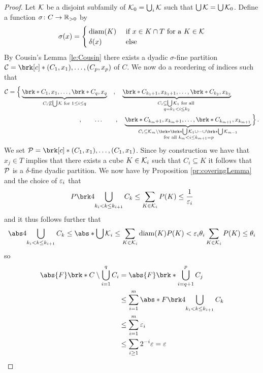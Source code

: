 \begin{proof}
Let $\mathcal{K}$ be a disjoint subfamily of $\mathcal{K}_0=\bigcup_i\mathcal{K}$ such that $\bigcup\mathcal{K}=\bigcup\mathcal{K}_0$. Define a function $\sigma\colon C\to \mathbb{R}_{>0}$ by
\begin{align*}
	\sigma(x)=\begin{cases}
		\operatorname{diam}(K)&\text{ if }x\in K\cap T\text{ for a }K\in\mathcal{K}\\
		\delta(x) &\text{ else}
	\end{cases}
\end{align*}
By Cousin's Lemma \ref{le:Cousin} there exists a dyadic $\sigma$-fine partition $\cC=\brk[c]*{(C_1,x_1),\dots,(C_p,x_p)}$ of $C$.
 We now do a reordering of indices such that
\begin{align*}
	\cC=\Big\{\underbrace{\brk*{C_1,x_1},\dots,\brk*{C_q,x_q}}_{C_i\not\subseteq\bigcup\cK\text{ for }1\leq i\leq q}\quad,\quad \underbrace{\brk*{C_{k_1+1},x_{k_1+1}},\dots,\brk*{C_{k_2},x_{k_2}}}_{\substack{C_i\subseteq \bigcup\cK_1 \text{ for all } \\ q=k_1< i\leq k_2}}\qquad\qquad&\\
	\qquad\qquad,\qquad\dots\qquad,\quad \underbrace{\brk*{C_{k_m+1},x_{k_m+1}},\dots,\brk*{C_{k_{m+1}},x_{k_{m+1}}}}_{\substack{C_i\subseteq \cK_m\setminus \brk*{\brk*{\bigcup\cK_1}\cup\dots\cup\brk*{\bigcup\cK_{m-1}}}\\ \text{ for all }  k_m< i\leq k_{m+1}=p}}\Big\}&\,.
\end{align*}
We set $\cP=\brk[c]*{(C_1,x_1),\dots,(C_1,x_1)}$. Since by construction we have that $x_j\in T$ implies that there exists a cube $K\in\mathcal{K}_i$ such that $C_i\subseteq K$ it follows that $\mathcal{P}$ is a $\delta$-fine dyadic partition.
We now have by Proposition \ref{pr:coveringLemma} and the choice of $\varepsilon_i$ that
\begin{align*}
	P\brk4{\bigcup_{k_i<k\leq k_{i+1}}C_k}
	\leq \sum_{K\in\cK_i}P(K)
	\leq \frac{1}{\e_i}
\end{align*}
and it thus follows further that
\begin{align*}
	\abs4{\bigcup_{k_i<k\leq k_{i+1}}C_k}
	\leq \abs*{\bigcup\cK_i}
	\leq \sum_{K\in\cK_i}\diam(K)P(K)
	<\e_i\theta_i\sum_{K\in\cK_i}P(K)\leq \theta_i
\end{align*}
so
\begin{align*}
	\abs{F}\brk*{C\setminus\bigcup_{i=1}^q C_i}
	&=\abs{F}\brk*{\bigcup_{i=q+1}^p C_j} \\
	&\leq \sum_{i=1}^m\abs*{F}\brk4{\bigcup_{k_i<k\leq k_{i+1}}C_k} \\
	&\leq \sum_{i=1}^m\e_i \\
	&\leq \sum_{i\geq 1}2^{-i}\e=\e
\end{align*}
\end{proof}

